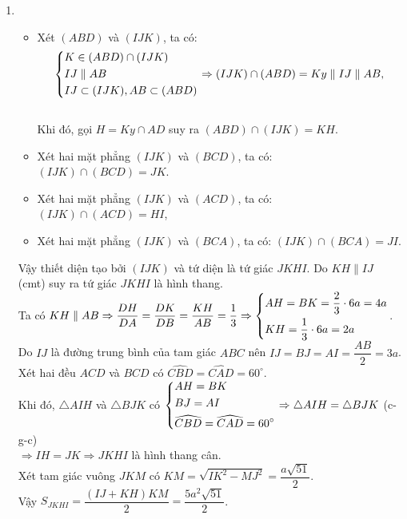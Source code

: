\begin{bt}
{\begin{enumerate}
	Theo định lý Tha-lét trong không gian, ta được $G_1G_2\parallel CD.$
	Mà $CD\subset (BCD)\Rightarrow G_1G_2\parallel (BCD)$.
	\item 
	\begin{itemize}
		\item Xét $(ABD)$ và $(IJK)$, ta có:
		$$\left\{\begin{aligned}&K\in (ABD)\cap (IJK)\\ &IJ\parallel AB\\ &IJ\subset (IJK), AB\subset (ABD)\end{aligned}\right.\Rightarrow (IJK)\cap (ABD)=Ky\parallel IJ\parallel AB,$$\\
		Khi đó, gọi $H=Ky\cap AD$ suy ra $(ABD)\cap (IJK)=KH$.
		\item Xét hai mặt phẳng $(IJK)$ và $(BCD)$, ta có: $(IJK)\cap (BCD)=JK$.
		\item Xét hai mặt phẳng $(IJK)$ và $(ACD)$, ta có: $(IJK)\cap (ACD)=HI$,
		\item Xét hai mặt phẳng $(IJK)$ và $(BCA)$, ta có: $(IJK)\cap (BCA)=JI$.
	\end{itemize}
Vậy thiết diện tạo bởi $(IJK)$ và tứ diện là tứ giác $JKHI$. Do $KH\parallel IJ$ (cmt) suy ra tứ giác $JKHI$ là hình thang.\\
Ta có $KH\parallel AB\Rightarrow \dfrac{DH}{DA}=\dfrac{DK}{DB}=\dfrac{KH}{AB}=\dfrac{1}{3}\Rightarrow \left\{\begin{aligned}& AH=BK=\dfrac{2}{3}\cdot 6a=4a\\ &KH=\dfrac{1}{3}\cdot 6a=2a\end{aligned}\right.$.\\
Do $IJ$ là đường trung bình của tam giác $ABC$ nên $IJ=BJ=AI=\dfrac{AB}{2}=3a$.\\
Xét hai đều $ACD$ và $BCD$ có $\widehat{CBD}=\widehat{CAD}=60^\circ$.\\
Khi đó, $\triangle AIH$ và $\triangle BJK$ có $\left\{\begin{aligned}&AH=BK\\ &BJ=AI\\&\widehat{CBD}=\widehat{CAD}=60^\circ\end{aligned}\right.\Rightarrow \triangle AIH=\triangle BJK$ (c-g-c)\\$\Rightarrow IH=JK\Rightarrow JKHI$ là hình thang cân.\\
Xét tam giác vuông $JKM$ có $KM=\sqrt{IK^2-MJ^2}=\dfrac{a\sqrt{51}}{2}$.\\
Vậy $S_{JKHI}=\dfrac{(IJ+KH)KM}{2}=\dfrac{5a^2\sqrt{51}}{2}$.
\end{enumerate}
}
\end{bt}